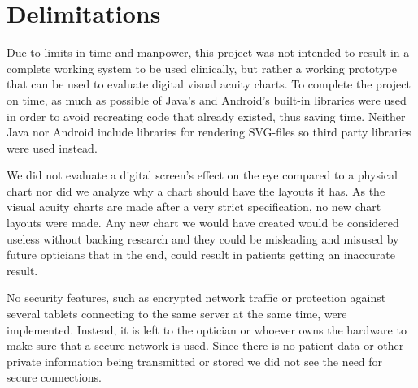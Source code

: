 \documentclass[12pt,a4paper,notitlepage]{report}
\begin{document}


\section{Delimitations}
Due to limits in time and manpower, this project was not intended to result in a complete working system to be used clinically, but rather a working prototype that can be used to evaluate digital visual acuity charts. To complete the project on time, as much as possible of Java's and Android's built-in libraries were used in order to avoid recreating code that already existed, thus saving time. Neither Java nor Android include libraries for rendering SVG-files so third party libraries were used instead.

We did not evaluate a digital screen's effect on the eye compared to a physical chart nor did we analyze why a chart should have the layouts it has. As the visual acuity charts are made after a very strict specification, no new chart layouts were made. Any new chart we would have created would be considered useless without backing research and they could be misleading and misused by future opticians that in the end, could result in patients getting an inaccurate result.

No security features, such as encrypted network traffic or protection against several tablets connecting to the same server at the same time, were implemented. Instead, it is left to the optician or whoever owns the hardware to make sure that a secure network is used. Since there is no patient data or other private information being transmitted or stored we did not see the need for secure connections.
\end{document}
